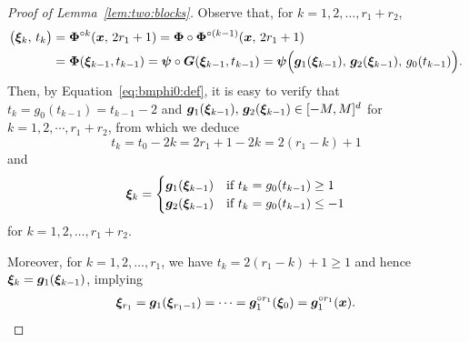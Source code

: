\documentclass[nohyperref]{article}
\theoremstyle{plain}
\theoremstyle{definition}
\theoremstyle{remark}
\begin{document}
\begin{proof}[Proof of Lemma~\ref{lem:two:blocks}]
		Observe that, for $k=1,2,\dotsc,r_1+r_2$,
		\begin{equation*}
			\begin{split}
				\big({\bm{\xi}}_k,\, t_k\big)
    &=
    {\bm{\Phi}}^{\circ k}({\bm{x}},\,2r_1+1)=
    {\bm{\Phi}}\circ{\bm{\Phi}}^{\circ (k-1)}({\bm{x}},\,2r_1+1)\\
    &={\bm{\Phi}}({\bm{\xi}}_{k-1},t_{k-1})
				={\bm{\psi}}\circ{\bm{G}}({\bm{\xi}}_{k-1},t_{k-1})
				={\bm{\psi}}\Big({\bm{g}}_1({\bm{\xi}}_{k-1}),\,{\bm{g}}_2({\bm{\xi}}_{k-1}),\,g_0(t_{k-1})\Big).
			\end{split}
		\end{equation*}		
 Then, by Equation~\eqref{eq:bmphi0:def}, it is easy to verify that
   $t_k=g_0(t_{k-1})=t_{k-1}-2$ and 
  ${\bm{g}}_1({\bm{\xi}}_{k-1}),\,{\bm{g}}_2({\bm{\xi}}_{k-1})\in [-M,M]^d$ 
   for $k=1,2,\cdots,r_1+r_2$,
 from which we deduce 
 \begin{equation*}
     t_k=t_0-2k=2r_1+1-2k=2(r_1-k)+1
 \end{equation*}
 and 
		\begin{equation*}
			{\bm{\xi}}_{k}=\begin{cases}
				{\bm{g}}_1({\bm{\xi}}_{k-1}) &  \textnormal{if} \   t_k=g_0(t_{k-1})\ge 1\\ 
				{\bm{g}}_2({\bm{\xi}}_{k-1}) &  \textnormal{if} \   t_k=g_0(t_{k-1})\le -1\\ 
			\end{cases}
		\end{equation*}
		for $k=1,2,\dotsc,r_1+r_2$. 
		
		
		Moreover, for $k=1,2,\dotsc,r_1$, we have $t_k=2(r_1-k)+1\ge 1$ and hence ${\bm{\xi}}_k={\bm{g}}_1({\bm{\xi}}_{k-1})$, implying
  		\begin{equation*}
			\begin{split}
				{\bm{\xi}}_{r_1}={\bm{g}}_1({\bm{\xi}}_{r_1-1})=\mathinner{\mkern-0.1mu\cdotp\mkern-0.3mu\cdotp\mkern-0.3mu\cdotp\mkern-0.1mu}={\bm{g}}_1^{\circ r_1}({\bm{\xi}}_0)={\bm{g}}_1^{\circ r_1}({\bm{x}}).
			\end{split}
		\end{equation*}
		

\end{proof}
\end{document}
